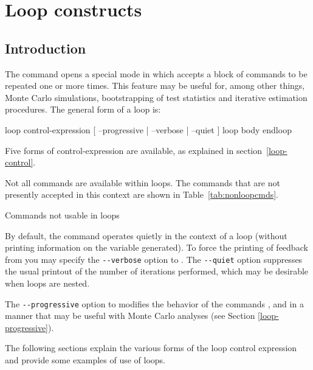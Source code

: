 \chapter{Loop constructs}
\label{chap:looping}

\section{Introduction}
\label{loop-intro}

The command  opens a special mode in which 
accepts a block of commands to be repeated one or more times.  This
feature may be useful for, among other things, Monte Carlo simulations,
bootstrapping of test statistics and iterative estimation procedures.
The general form of a loop is:

\begin{code}
loop control-expression [ --progressive | --verbose | --quiet ]
   loop body
endloop
\end{code}

Five forms of control-expression are available, as explained in
section~\ref{loop-control}.

Not all  commands are available within loops.  The commands
that are not presently accepted in this context are shown in
Table~\ref{tab:nonloopcmds}.

\begin{table}[htbp]
\caption{Commands not usable in loops}
\label{tab:nonloopcmds}
\begin{center}

\end{center}
\end{table}

By default, the  command operates quietly in the context of
a loop (without printing information on the variable generated).  To
force the printing of feedback from  you may specify the
\verb+--verbose+ option to .  The \verb+--quiet+ option
suppresses the usual printout of the number of iterations performed,
which may be desirable when loops are nested.

The \verb+--progressive+ option to  modifies the behavior of
the commands ,  and  in a manner that
may be useful with Monte Carlo analyses (see Section
\ref{loop-progressive}).
    
The following sections explain the various forms of the loop control
expression and provide some examples of use of loops.  

